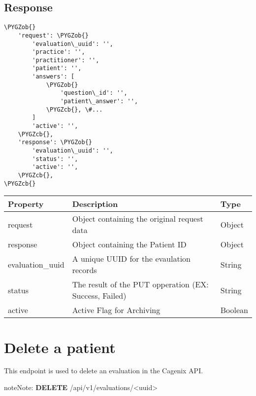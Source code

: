 \documentclass[letterpaper,10pt,english]{sphinxmanual}
\def\PYGZob{\char`\{}
\def\PYGZcb{\char`\}}
\begin{document}
\subsection{Response}
\label{dev-api-evaluations:id3}
\begin{Verbatim}[commandchars=\\\{\}]
\PYGZob{}
    'request': \PYGZob{}
        'evaluation\_uuid': '',
        'practice': '',
        'practitioner': '',
        'patient': '',
        'answers': [
            \PYGZob{}
                'question\_id': '',
                'patient\_answer': '',
            \PYGZcb{}, \#...
        ]
        'active': '',
    \PYGZcb{},
    'response': \PYGZob{}
        'evaluation\_uuid': '',
        'status': '',
        'active': '',
    \PYGZcb{},
\PYGZcb{}
\end{Verbatim}

\begin{tabulary}{\linewidth}{|L|L|L|}
\hline
\textsf{\relax 
Property
} & \textsf{\relax 
Description
} & \textsf{\relax 
Type
}\\
\hline
request
 & 
Object containing the original
request data
 & 
Object
\\

response
 & 
Object containing the Patient ID
 & 
Object
\\

evaluation\_uuid
 & 
A unique UUID for the evaulation
records
 & 
String
\\

status
 & 
The result of the PUT opperation
(EX: Success, Failed)
 & 
String
\\

active
 & 
Active Flag for Archiving
 & 
Boolean
\\
\hline\end{tabulary}



\section{Delete a patient}
\label{dev-api-evaluations:delete-a-patient}
This endpoint is used to delete an evaluation in the Cagenix API.

\begin{notice}{note}{Note:}
\textbf{DELETE} /api/v1/evaluations/\textless{}uuid\textgreater{}
\end{notice}
\end{document}
